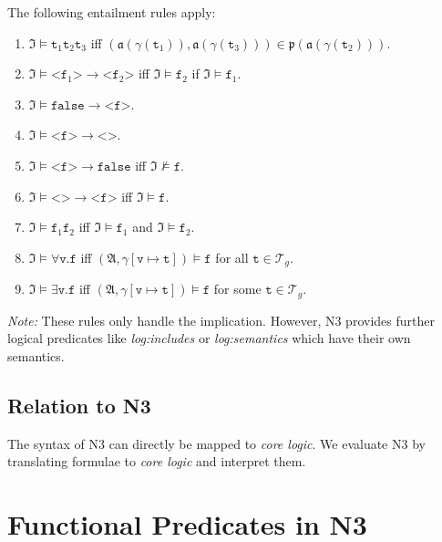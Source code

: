 \documentclass[runningheads]{llncs}
\begin{document}
\noindent The following entailment rules apply:

\begin{enumerate}
  \item $\mathfrak{I} \vDash \texttt{t}_1 \texttt{t}_2 \texttt{t}_3$ iff $(\mathfrak{a}(\gamma(\texttt{t}_1)), \mathfrak{a}(\gamma(\texttt{t}_3))) \in \mathfrak{p}(\mathfrak{a}(\gamma(\texttt{t}_2)))$.
  \item $\mathfrak{I} \vDash \texttt{<f}_1\texttt{>} \rightarrow \texttt{<f}_2\texttt{>}$ iff $\mathfrak{I} \vDash \texttt{f}_2$ if $\mathfrak{I} \vDash \texttt{f}_1$.
  \item $\mathfrak{I} \vDash \texttt{false} \rightarrow \texttt{<f>}$.
  \item $\mathfrak{I} \vDash \texttt{<f>} \rightarrow \texttt{<>}$.
  \item $\mathfrak{I} \vDash \texttt{<f>} \rightarrow \texttt{false}$ iff $\mathfrak{I} \nvDash \texttt{f}$.
  \item $\mathfrak{I} \vDash \texttt{<>} \rightarrow \texttt{<f>}$ iff $\mathfrak{I} \vDash \texttt{f}$.
  \item $\mathfrak{I} \vDash \texttt{f}_1 \texttt{f}_2$ iff $\mathfrak{I} \vDash \texttt{f}_1$ and $\mathfrak{I} \vDash \texttt{f}_2$.
  \item $\mathfrak{I} \vDash \forall\texttt{v.f}$ iff $(\mathfrak{A}, \gamma\left[\texttt{v} \mapsto \texttt{t}\right]) \vDash \texttt{f}$ for all $\texttt{t} \in \mathcal{T}_g$.
  \item $\mathfrak{I} \vDash \exists\texttt{v.f}$ iff $(\mathfrak{A}, \gamma\left[\texttt{v} \mapsto \texttt{t}\right]) \vDash \texttt{f}$ for some $\texttt{t} \in \mathcal{T}_g$.
\end{enumerate}

\noindent\emph{Note:} These rules only handle the implication.
However, N3 provides further logical predicates like \emph{log:includes} or \emph{log:semantics} which have their own semantics.



\subsection{Relation to N3}

The syntax of N3 can directly be mapped to \emph{core logic}.
We evaluate N3 by translating formulae to \emph{core logic} and interpret them.



\section{Functional Predicates in N3}
\label{sec:func}
\end{document}
